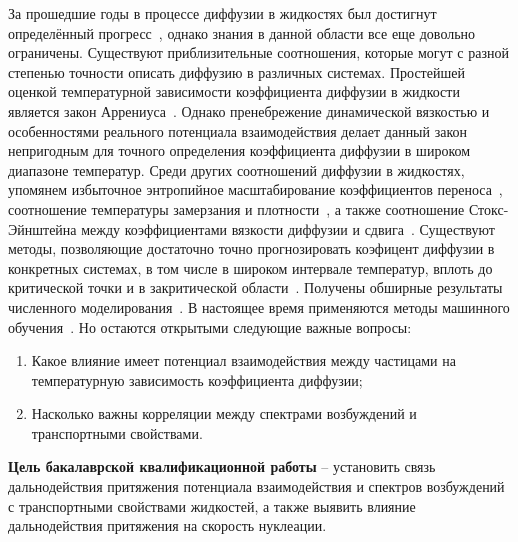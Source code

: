 За прошедшие годы в процессе диффузии в жидкостях был достигнут определённый прогресс~\cite{FrenkelBook,HansenBook,GrootBook,MarchBook}, однако знания в данной области все еще довольно ограничены.
Существуют приблизительные соотношения, которые могут с разной степенью точности описать диффузию в различных системах.
Простейшей оценкой температурной зависимости коэффициента диффузии в жидкости является закон Аррениуса~\cite{10.1126/science.278.5336.257}.
Однако пренебрежение динамической вязкостью и особенностями реального потенциала взаимодействия делает данный закон непригодным для точного определения коэффициента диффузии в широком диапазоне температур.
Среди других соотношений диффузии в жидкостях, упомянем избыточное энтропийное масштабирование коэффициентов переноса~\cite{10.1103/physreva.15.2545, 10.1038/381137a0, 10.1063/1.5055064}, соотношение температуры замерзания и плотности~\cite{10.1103/physreve.62.7524, 10.1063/1.5022058, 10.1063/1.5044703, 10.1103/physreve.103.042122}, а также соотношение Стокс-Эйнштейна между коэффициентами вязкости диффузии и сдвига~\cite{10.1063/1.446338, 10.1002/BBPC.19900940313, 10.1103/physreve.95.052122, 10.1063/1.5080662, 10.1080/00268976.2019.1643045}.
Существуют методы, позволяющие достаточно точно прогнозировать коэфицент диффузии в конкретных системах, в том числе в широком интервале температур, вплоть до критической точки и в закритической области~\cite{10.1063/1.1607953, 10.1016/j.camwa.2019.11.012, 10.1063/1.441097}.
Получены обширные результаты численного моделирования~\cite{10.1063/1.1786579, 10.1016/j.fluid.2011.03.002}.
В настоящее время применяются методы машинного обучения~\cite{10.1063/5.0011512}.
Но остаются открытыми следующие важные вопросы:
\begin{enumerate}
\item Какое влияние имеет потенциал взаимодействия между частицами на температурную зависимость коэффициента диффузии;
\item Насколько важны корреляции между спектрами возбуждений и транспортными свойствами.
\end{enumerate}

\newpage

\textbf{Цель бакалаврской квалификационной работы} -- установить связь \\ дальнодействия притяжения потенциала взаимодействия и спектров возбуждений с транспортными свойствами жидкостей, а также выявить влияние дальнодействия притяжения на скорость нуклеации.

